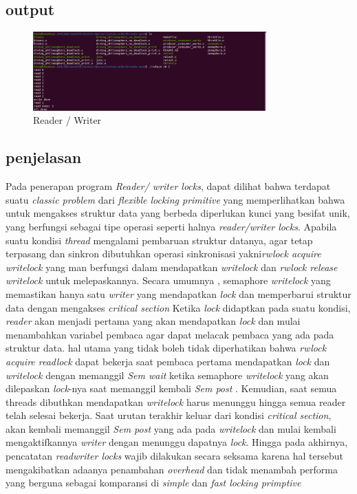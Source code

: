 \documentclass[11pt,a4paper]{article}
\begin{document}
\subsection*{output}
\begin{figure}[h]
\centering
\includegraphics[width=0.8\textwidth]{Figure/testing/PercobaanRwlock.png}
\caption{Reader / Writer}
\end{figure}
\subsection{penjelasan}
Pada penerapan program \textit{Reader/ writer locks}, dapat dilihat bahwa terdapat suatu \textit{classic problem} dari \textit{flexible locking primitive} yang memperlihatkan bahwa untuk mengakses struktur data yang berbeda diperlukan kunci yang besifat unik, yang berfungsi sebagai tipe operasi seperti halnya \textit{reader/writer locks}. Apabila suatu kondisi \textit{thread} mengalami pembaruan struktur datanya, agar tetap terpasang dan sinkron dibutuhkan operasi sinkronisasi yakni\textit{rwlock acquire writelock} yang man berfungsi dalam mendapatkan \textit{writelock} dan \textit{rwlock release writelock} untuk melepaskannya. Secara umumnya , semaphore \textit{writelock} yang memastikan hanya satu \textit{writer} yang mendapatkan \textit{lock} dan memperbarui struktur data dengan mengakses \textit{critical section}
      Ketika \textit{lock} didaptkan pada suatu kondisi, \textit{reader} akan
menjadi pertama yang akan mendapatkan \textit{lock} dan mulai menambahkan variabel pembaca agar dapat melacak pembaca yang ada pada struktur data. hal utama yang tidak boleh tidak diperhatikan bahwa \textit{rwlock acquire readlock} dapat bekerja saat pembaca pertama mendapatkan \textit{lock} dan \textit{writelock} dengan memanggil \textit{Sem wait} ketika semaphore \textit{writelock} yang akan dilepaskan \textit{lock}-nya saat memanggil kembali \textit{Sem post} . Kemudian, saat semua threads dibuthkan mendapatkan \textit{writelock} harus menunggu hingga semua reader telah selesai bekerja. Saat urutan terakhir keluar dari kondisi \textit{critical section}, akan kembali memanggil \textit{Sem post} yang ada pada \textit{writelock} dan mulai kembali mengaktifkannya \textit{writer}  dengan menunggu dapatnya \textit{lock}. Hingga pada akhirnya, pencatatan \textit{readwriter locks} wajib dilakukan secara seksama karena hal tersebut mengakibatkan adaanya penambahan \textit{overhead} dan tidak menambah performa yang berguna sebagai komparansi di \textit{simple} dan \textit{fast locking primptive}
\end{document}
